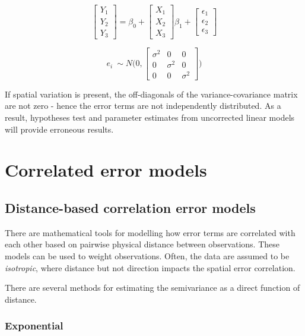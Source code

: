 \documentclass[
]{book}
\begin{document}
\[\left[ {\begin{array}{ccc} Y_1\\ Y_2\\ Y_3 \end{array} } \right] = \beta_0 + 
\left[ {\begin{array}{ccc} X_1\\ X_2\\ X_3 \end{array}  } \right] \beta_1 +
\left[ {\begin{array}{ccc} \epsilon_1\\ \epsilon_2\\ \epsilon_3 \end{array}  } \right] \]

\[e_i ~\sim N \Bigg( 0, 
\left[ {\begin{array}{ccc} \sigma^2 & 0 & 0 \\ 0 & \sigma^2 & 0\\ 0 & 0 & \sigma^2\end{array}  } \right] \Bigg) \]

If spatial variation is present, the off-diagonals of the variance-covariance matrix are not zero - hence the error terms are not independently distributed. As a result, hypotheses test and parameter estimates from uncorrected linear models will provide erroneous results.

\hypertarget{correlated-error-models}{%
\section{Correlated error models}\label{correlated-error-models}}

\hypertarget{distance-based-correlation-error-models}{%
\subsection{Distance-based correlation error models}\label{distance-based-correlation-error-models}}

There are mathematical tools for modelling how error terms are correlated with each other based on pairwise physical distance between observations. These models can be used to weight observations. Often, the data are assumed to be \emph{isotropic}, where distance but not direction impacts the spatial error correlation.

There are several methods for estimating the semivariance as a direct function of distance.

\hypertarget{exponential}{%
\subsubsection{Exponential}\label{exponential}}
\end{document}
